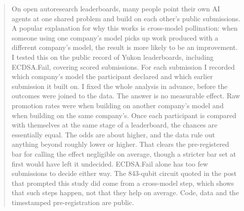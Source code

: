 \begin{abstract}
On open autoresearch leaderboards, many people point their own AI agents at one shared problem and build on each other's public submissions.
A popular explanation for why this works is cross-model pollination: when someone using one company's model picks up work produced with a different company's model, the result is more likely to be an improvement.
I tested this on the public record of \StudyK{} Yukon leaderboards, including ECDSA.Fail, covering \AnalysisRowsTotal{} scored submissions.
For each submission I recorded which company's model the participant declared and which earlier submission it built on.
I fixed the whole analysis in advance, before the outcomes were joined to the data.
The answer is no measurable effect.
Raw promotion rates were \RawCrossRate{} when building on another company's model and \RawSameRate{} when building on the same company's.
Once each participant is compared with themselves at the same stage of a leaderboard, the chances are essentially equal.
The odds are about \PlainPointPct{} higher, and the data rule out anything beyond roughly \PlainLowPct{} lower or \PlainHighPct{} higher.
That clears the pre-registered bar for calling the effect negligible on average, though a stricter bar set at first would have left it undecided.
ECDSA.Fail alone has too few submissions to decide either way.
The 843-qubit circuit quoted in the post that prompted this study did come from a cross-model step, which shows that such steps happen, not that they help on average.
Code, data and the timestamped pre-registration are public.
\end{abstract}
